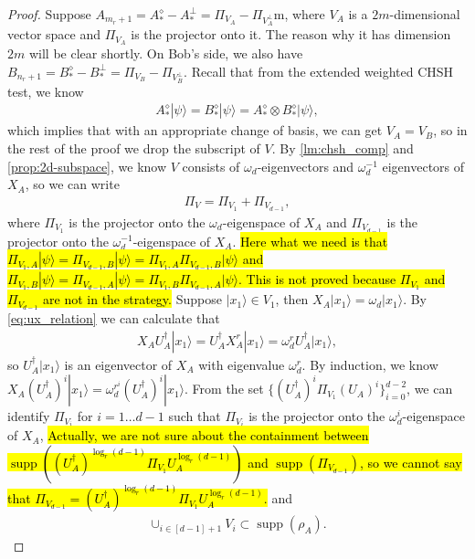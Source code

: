 \documentclass[11pt,letterpaper]{article}
\newcommand{\ket}[1]{|#1\rangle}
\newcommand{\x}{\otimes}
\newcommand{\ct}{^{\dagger}}
\DeclareMathOperator{\supp}{supp}
\newcommand{\1}{\mathbb{1}}
\theoremstyle{definition}
\begin{document}
\begin{proof}
Suppose $A_{m_r+1} = A_\ast^\diamond- A_\ast^\perp = \Pi_{V_A} - \Pi_{V_A^\perp}$m, where $V_A$ is a
$2m$-dimensional vector space and $\Pi_{V_A}$ is the projector onto it. The reason why it has dimension $2m$
will be clear shortly. On Bob's side, we also have $B_{n_r+1} = B_\ast^\diamond- B_\ast^\perp = \Pi_{V_B} - \Pi_{V_B^\perp}$.
Recall that from the extended weighted CHSH test, we know
\begin{align}
	A_\ast^\diamond \ket{\psi} = B_\ast^\diamond \ket{\psi} = A_\ast^\diamond \x B_\ast^\diamond \ket{\psi},
\end{align}
which implies that with an appropriate change of basis, we can get $V_A = V_B$, so in the rest of the proof
we drop the subscript of $V$.
By \cref{lm:chsh_comp} and \cref{prop:2d-subspace}, we know $V$ consists of $\omega_d$-eigenvectors and $\omega_d^{-1}$ eigenvectors of 
$X_A$, so we can write 
\begin{align}
	\Pi_{V} = \Pi_{V_1} + \Pi_{V_{d-1}},
\end{align}
where $\Pi_{V_{1}}$ is the projector onto the $\omega_d$-eigenspace of $X_A$ and $\Pi_{V_{d-1}}$ is the projector 
onto the $\omega_d^{-1}$-eigenspace of $X_A$.
\hl{Here what we need is that $\Pi_{V_1,A} \ket{\psi} = \Pi_{V_{d-1},B} \ket{\psi} = \Pi_{V_1,A}\Pi_{V_{d-1},B}\ket{\psi}$
and $\Pi_{V_1,B} \ket{\psi} = \Pi_{V_{d-1},A} \ket{\psi} = \Pi_{V_1,B}\Pi_{V_{d-1},A}\ket{\psi}$.
This is not proved because $\Pi_{V_1}$ and $\Pi_{V_{d-1}}$ are not in the strategy.}
Suppose $\ket{x_{1}} \in V_{1}$, then $X_A \ket{x_{1}} = \omega_d \ket{x_{1}}$.
By \cref{eq:ux_relation} we can calculate that
\begin{align}
\label{eq:ladder}
 X_AU_A^\dagger \ket{x_{1}} = U_A^\dagger X_A^r \ket{x_{1}} = \omega_d^r U_A^\dagger \ket{x_{1}},
\end{align}
so $U_A^\dagger \ket{x_{1}}$ is an eigenvector of $X_A$ with eigenvalue $\omega_d^r$.
By induction, we know $X_A (U_A^\dagger)^i \ket{x_{1}} = \omega_d^{r^i} (U_A^\dagger)^i\ket{x_{1}}$. 
From the set $\{(U_A^\dagger)^i \Pi_{V_1} (U_A)^i \}_{i=0}^{d-2}$, we can identify $\Pi_{V_i}$ for $i = 1 \dots  d-1$
such that $\Pi_{V_i}$ is the projector onto the $\omega_d^i$-eigenspace of $X_A$,
\hl{Actually, we are not sure about the containment between $\supp((U_A\ct)^{\log_r(d-1)} \Pi_{V_1} U_A^{\log_r(d-1)})$ and 
$\supp(\Pi_{V_{d-1}})$, so we cannot say that $\Pi_{V_{d-1}} = (U_A\ct)^{\log_r(d-1)} \Pi_{V_1} U_A^{\log_r(d-1)}$.}
and 
\begin{align}
 \cup_{i \in [d-1]+1} V_i \subset \supp(\rho_A).

\end{align}
\end{proof}
\end{document}
